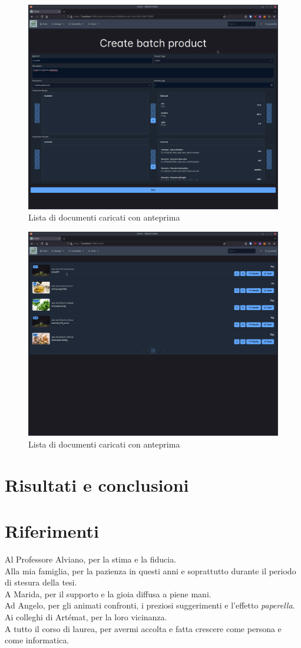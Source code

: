 \documentclass[a4paper,11pt]{article}
\begin{document}
\begin{figure}[H]
  \centering
  \includegraphics[width=0.5\linewidth]{screenIotChain/0012.png}
  \caption{Lista di documenti caricati con anteprima}
  \label{fig:screen12}
\end{figure}


\begin{figure}[H]
  \centering
  \includegraphics[width=0.5\linewidth]{screenIotChain/0013.png}
  \caption{Lista di documenti caricati con anteprima}
  \label{fig:screen13}
\end{figure}



\clearpage
\section{Risultati e conclusioni}

\clearpage
\section{Riferimenti}
\listoffigures
\clearpage
\listoftables
\clearpage
\renewcommand\listoflistingscaption{Elenco del codice sorgente}
\listoflistings %
\clearpage
\printbibliography
\clearpage
{}
\centering
\vspace*{\fill}
Al Professore Alviano, per la stima e la fiducia.
\\
Alla mia famiglia, per la pazienza in questi anni e soprattutto durante il periodo di stesura della tesi.
\\
A Marida, per il supporto e la gioia diffusa a piene mani.
\\
Ad Angelo, per gli animati confronti, i preziosi suggerimenti e l’effetto \textit{paperella}.
\\
Ai colleghi di Artémat, per la loro vicinanza.
\\
A tutto il corso di laurea, per avermi accolta e fatta crescere come persona e come informatica.
\vspace*{\fill}
\end{document}
